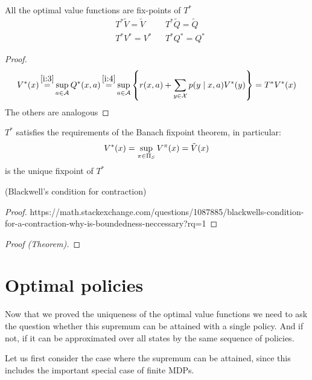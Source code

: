 \begin{corollary} All the optimal value functions are fix-points of \(T^*\)
	\begin{align*}
	&T^*\tilde{V}=\tilde{V}  && T^*\tilde{Q}=\tilde{Q}\\
	&T^*V^*=V^* && T^*Q^*=Q^*
	\end{align*}
\end{corollary}

\begin{proof}
\begin{align*}
	V^*(x)\xeq{\ref{i:3}}\sup_{a\in\cA}Q^*(x,a)\xeq{\ref{i:4}}\sup_{a\in\cA}\left\{r(x,a)+\sum_{y\in\cX}p(y\mid x,a) V^*(y)\right\} =T^*V^*(x)
\end{align*}
The others are analogous
\end{proof}


\begin{thm}
\(T^*\) satisfies the requirements of the Banach fixpoint theorem, in particular:
	\[V^*(x)=\sup_{\pi\in\Pi_S}V^\pi(x)=\tilde{V}(x) \]
is the unique fixpoint of \(T^*\)
\end{thm}

\begin{lemma}(Blackwell's condition for contraction)
\end{lemma}

\begin{proof}
https://math.stackexchange.com/questions/1087885/blackwells-condition-for-a-contraction-why-is-boundedness-neccessary?rq=1
\end{proof}

\begin{proof}[Proof (Theorem)]
\end{proof}

\section{Optimal policies}
Now that we proved the uniqueness of the optimal value functions we need to ask the question whether this supremum can be attained with a single policy. And if not, if it can be approximated over all states by the same sequence of policies. 

Let us first consider the case where the supremum can be attained, since this includes the important special case of finite MDPs.  

